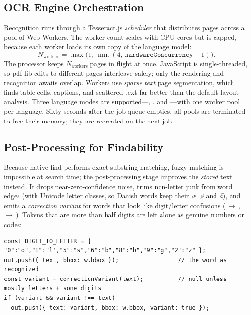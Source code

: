 \subsection{OCR Engine Orchestration}
Recognition runs through a Tesseract.js \emph{scheduler} that distributes pages
across a pool of Web Workers. The worker count scales with CPU cores but is
capped, because each worker loads its own copy of the language model:
\begin{equation}
  N_{\text{workers}} = \max\!\big(1,\ \min(4,\ \texttt{hardwareConcurrency}-1)\big).
\end{equation}
The processor keeps $N_{\text{workers}}$ pages in flight at once. JavaScript is
single-threaded, so pdf-lib edits to different pages interleave safely; only the
rendering and recognition awaits overlap. Workers use \emph{sparse text} page
segmentation, which finds table cells, captions, and scattered text far better
than the default layout analysis. Three language modes are supported---,
, and ---with one worker pool per language. Sixty seconds
after the job queue empties, all pools are terminated to free their memory; they
are recreated on the next job.

\subsection{Post-Processing for Findability}
Because native find performs exact substring matching, fuzzy matching is
impossible at search time; the post-processing stage improves the \emph{stored}
text instead. It drops near-zero-confidence noise, trims non-letter junk from
word edges (with Unicode letter classes, so Danish words keep their
\textit{æ}, \textit{ø} and \textit{å}), and emits a \emph{correction variant}
for words that look like digit/letter confusions (\,$\to$\,,
\,$\to$\,). Tokens that are more than half digits are left
alone as genuine numbers or codes:

\begin{lstlisting}[caption={Emitting a correction variant for OCR tokens with likely digit/letter confusions (\code{ocr-postprocess.js}).}, label={lst:variant}]
const DIGIT_TO_LETTER = { "0":"o","1":"l","5":"s","6":"b","8":"b","9":"g","2":"z" };
out.push({ text, bbox: w.bbox });                 // the word as recognized
const variant = correctionVariant(text);          // null unless mostly letters + some digits
if (variant && variant !== text)
  out.push({ text: variant, bbox: w.bbox, variant: true });
\end{lstlisting}

